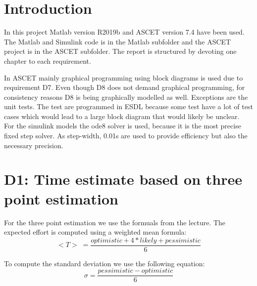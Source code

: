 
\chapter{Introduction}\label{cha:Introduction}
In this project Matlab version R2019b and ASCET version 7.4 have been used.
The Matlab and Simulink code is in the Matlab subfolder and the ASCET project is in the ASCET subfolder.
The report is structured by devoting one chapter to each requirement.

In ASCET mainly graphical programming using block diagrams is used due to requirement D7. Even though D8 does not demand graphical programming, for consistency reasons D8 is being graphically modelled as well. Exceptions are the unit tests. The test are programmed in ESDL because some test have a lot of test cases which would lead to a large block diagram that would likely be unclear.\\
For the simulink models the ode8 solver is used, because it is the most precise fixed step solver. As step-width, 0.01s are used to provide efficiency but also the necessary precision.

\chapter{D1: Time estimate based on three point estimation}\label{cha:D1}
For the three point estimation we use the formuals from the lecture.
The expected effort is computed using a weighted mean formula:
\begin{equation}
	<T>\; = \frac{optimistic + 4*likely + pessimistic}{6}
\end{equation}

To compute the standard deviation we use the following equation:
\begin{equation}
	\sigma = \frac{pessimistic-optimistic}{6}
\end{equation}

